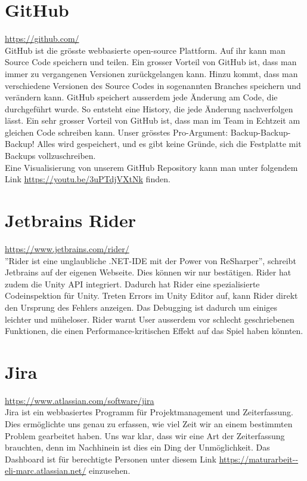 \section{GitHub}
\url{https://github.com/}\\
GitHub ist die grösste webbasierte open-source Plattform. Auf ihr kann man Source Code speichern und teilen. Ein grosser Vorteil von GitHub ist, dass man immer zu vergangenen Versionen zurückgelangen kann.
Hinzu kommt, dass man verschiedene Versionen des Source Codes in sogenannten Branches speichern und verändern kann. GitHub speichert ausserdem jede Änderung am Code, die durchgeführt wurde. So entsteht eine History, die jede Änderung nachverfolgen lässt. 
Ein sehr grosser Vorteil von GitHub ist, dass man im Team in Echtzeit am gleichen Code schreiben kann. Unser grösstes Pro-Argument: Backup-Backup-Backup!
Alles wird gespeichert, und es gibt keine Gründe, sich die Festplatte mit Backups vollzuschreiben. \\
Eine Visualisierung von unserem \gls{GitHub Repository} kann man unter folgendem Link \url{https://youtu.be/3uPTdjVXtNk} finden.


\section{Jetbrains Rider}
\url{https://www.jetbrains.com/rider/}\\
''Rider ist eine unglaubliche .NET-IDE mit der Power von ReSharper'', schreibt Jetbrains auf der eigenen Webseite. Dies können wir nur bestätigen. Rider hat zudem die Unity API integriert. Dadurch hat Rider eine
spezialisierte Codeinspektion für Unity. Treten Errors im Unity Editor auf, kann Rider direkt den Ursprung des Fehlers anzeigen. Das Debugging ist dadurch um einiges leichter und müheloser. 
Rider warnt User ausserdem vor schlecht geschriebenen Funktionen, die einen Performance-kritischen Effekt auf das Spiel haben könnten. 


\section{Jira}
\url{https://www.atlassian.com/software/jira}\\
Jira ist ein webbasiertes Programm für Projektmanagement und Zeiterfassung. Dies ermöglichte uns genau zu erfassen, wie viel Zeit wir an einem bestimmten Problem gearbeitet haben. Uns war klar, dass wir eine Art 
der Zeiterfassung brauchten, denn im Nachhinein ist dies ein Ding der Unmöglichkeit. Das Dashboard ist für berechtigte Personen unter diesem Link \url{https://maturarbeit--eli-marc.atlassian.net/} einzusehen.

